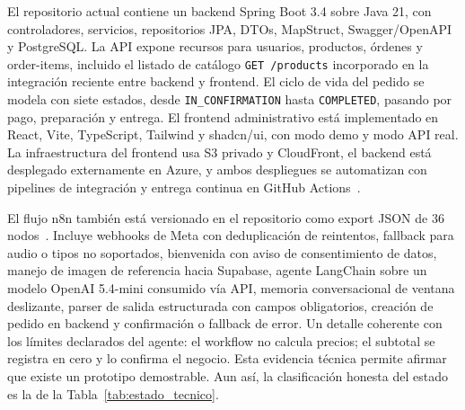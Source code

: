 El repositorio actual contiene un backend Spring Boot 3.4 sobre Java 21, con controladores, servicios, repositorios JPA, DTOs, MapStruct, Swagger/OpenAPI y PostgreSQL\@. La API expone recursos para usuarios, productos, órdenes y order-items, incluido el listado de catálogo \texttt{GET /products} incorporado en la integración reciente entre backend y frontend. El ciclo de vida del pedido se modela con siete estados, desde \texttt{IN\_CONFIRMATION} hasta \texttt{COMPLETED}, pasando por pago, preparación y entrega. El frontend administrativo está implementado en React, Vite, TypeScript, Tailwind y shadcn/ui, con modo demo y modo API real. La infraestructura del frontend usa S3 privado y CloudFront, el backend está desplegado externamente en Azure, y ambos despliegues se automatizan con pipelines de integración y entrega continua en GitHub Actions~\cite{humble2010}.

El flujo n8n también está versionado en el repositorio como export JSON de 36 nodos~\cite{n8n2026}. Incluye webhooks de Meta con deduplicación de reintentos, fallback para audio o tipos no soportados, bienvenida con aviso de consentimiento de datos, manejo de imagen de referencia hacia Supabase, agente LangChain sobre un modelo OpenAI 5.4-mini consumido vía API, memoria conversacional de ventana deslizante, parser de salida estructurada con campos obligatorios, creación de pedido en backend y confirmación o fallback de error. Un detalle coherente con los límites declarados del agente: el workflow no calcula precios; el subtotal se registra en cero y lo confirma el negocio. Esta evidencia técnica permite afirmar que existe un prototipo demostrable. Aun así, la clasificación honesta del estado es la de la Tabla~\ref{tab:estado_tecnico}.

